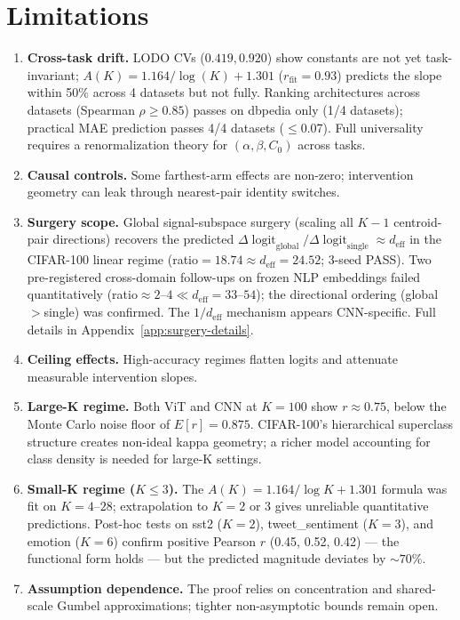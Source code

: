 \documentclass{article}
\DeclareMathOperator{\logit}{logit}
\begin{document}
\section{Limitations}
\label{sec:limitations}
\begin{enumerate}
\item \textbf{Cross-task drift.} LODO CVs ($0.419, 0.920$) show constants are not yet task-invariant; $A(K) = 1.164/\log(K) + 1.301$ ($r_\mathrm{fit}=0.93$) predicts the slope within 50\% across 4 datasets but not fully. Ranking architectures across datasets (Spearman $\rho\geq0.85$) passes on dbpedia only (1/4 datasets); practical MAE prediction passes 4/4 datasets ($\leq$0.07). Full universality requires a renormalization theory for $(\alpha,\beta,C_0)$ across tasks.
\item \textbf{Causal controls.} Some farthest-arm effects are non-zero; intervention geometry can leak through nearest-pair identity switches.
\item \textbf{Surgery scope.} Global signal-subspace surgery (scaling all $K-1$ centroid-pair directions) recovers the predicted $\Delta\logit_{\mathrm{global}}/\Delta\logit_{\mathrm{single}}\approx d_{\mathrm{eff}}$ in the CIFAR-100 linear regime (ratio$=18.74\approx d_{\mathrm{eff}}=24.52$; 3-seed PASS). Two pre-registered cross-domain follow-ups on frozen NLP embeddings failed quantitatively (ratio$\approx2$--$4\ll d_{\mathrm{eff}}=33$--$54$); the directional ordering (global$>$single) was confirmed. The $1/d_{\mathrm{eff}}$ mechanism appears CNN-specific. Full details in Appendix~\ref{app:surgery-details}.
\item \textbf{Ceiling effects.} High-accuracy regimes flatten logits and attenuate measurable intervention slopes.
\item \textbf{Large-K regime.} Both ViT and CNN at $K=100$ show $r\approx0.75$, below the Monte Carlo noise floor of $E[r]=0.875$. CIFAR-100's hierarchical superclass structure creates non-ideal kappa geometry; a richer model accounting for class density is needed for large-K settings.
\item \textbf{Small-K regime ($K\leq3$).} The $A(K)=1.164/\log K+1.301$ formula was fit on $K=4$--$28$; extrapolation to $K=2$ or $3$ gives unreliable quantitative predictions. Post-hoc tests on sst2 ($K=2$), tweet\_sentiment ($K=3$), and emotion ($K=6$) confirm positive Pearson $r$ (0.45, 0.52, 0.42) --- the functional form holds --- but the predicted magnitude deviates by $\sim70\%$.
\item \textbf{Assumption dependence.} The proof relies on concentration and shared-scale Gumbel approximations; tighter non-asymptotic bounds remain open.

\end{enumerate}
\end{document}
